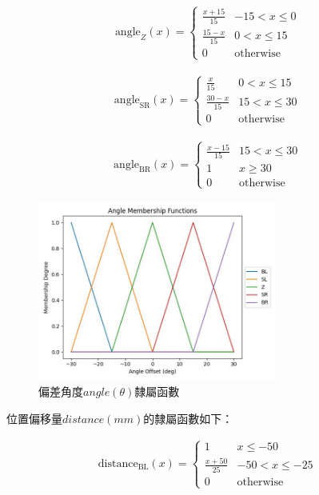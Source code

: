 \documentclass[12pt]{article}       %
\begin{document}
\begin{align}
    \text{angle}_{Z}(x) = 
    \begin{cases}
    \frac{x + 15}{15} & -15 < x \le 0 \\
    \frac{15 - x}{15} & 0 < x \le 15 \\
    0 & \text{otherwise}
    \end{cases}    
\end{align}

\begin{align}
    \text{angle}_{\text{SR}}(x) = 
    \begin{cases}
    \frac{x}{15} & 0 < x \le 15 \\
    \frac{30 - x}{15} & 15 < x \le 30 \\
    0 & \text{otherwise}
    \end{cases}    
\end{align}

\begin{align}
    \text{angle}_{\text{BR}}(x) = 
    \begin{cases}
    \frac{x - 15}{15} & 15 < x \le 30 \\
    1 & x \ge 30 \\
    0 & \text{otherwise}
    \end{cases}    
\end{align}

\begin{figure}[H]
    \centering
    \includegraphics[width=0.7\textwidth]{20.jpg}     %
    \caption{偏差角度$angle(\theta)$隸屬函數}    %
    \label{fig:20}    %
\end{figure}

位置偏移量$distance(mm)$的隸屬函數如下：

\begin{align}
    \text{distance}_{\text{BL}}(x) = 
    \begin{cases}
    1 & x \le -50 \\
    \frac{x + 50}{25} & -50 < x \le -25 \\
    0 & \text{otherwise}
    \end{cases}    
\end{align}
\end{document}
